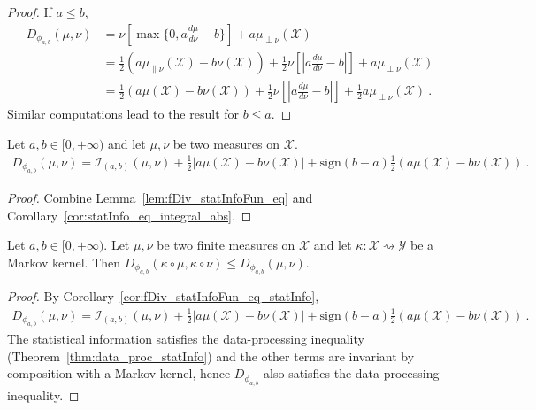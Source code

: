 \begin{proof}\leanok
\uses{}
If $a \le b$,
\begin{align*}
D_{\phi_{a,b}}(\mu, \nu)
&= \nu\left[ \max\{0, a \frac{d\mu}{d\nu} - b\} \right] + a \mu_{\perp \nu}(\mathcal X)
\\
&= \frac{1}{2}(a \mu_{\parallel \nu}(\mathcal X) - b \nu(\mathcal X)) + \frac{1}{2}\nu\left[ \left\vert a \frac{d\mu}{d\nu} - b \right\vert \right] + a \mu_{\perp \nu}(\mathcal X)
\\
&= \frac{1}{2}(a \mu(\mathcal X) - b \nu(\mathcal X)) + \frac{1}{2}\nu\left[ \left\vert a \frac{d\mu}{d\nu} - b \right\vert \right] + \frac{1}{2}a \mu_{\perp \nu}(\mathcal X)
\: . 
\end{align*}
Similar computations lead to the result for $b \le a$.
\end{proof}

\begin{corollary}
  \label{cor:fDiv_statInfoFun_eq_statInfo}
  \leanok
  Let $a,b \in [0, +\infty)$ and let $\mu, \nu$ be two measures on $\mathcal X$.
  \begin{align*}
  D_{\phi_{a,b}}(\mu, \nu) = \mathcal I_{(a,b)}(\mu, \nu) + \frac{1}{2} \left\vert a \mu(\mathcal X) - b \nu(\mathcal X) \right\vert + \text{sign}(b-a)\frac{1}{2}(a \mu(\mathcal X) - b \nu(\mathcal X))
  \: .
  \end{align*}
\end{corollary}

\begin{proof}\leanok
{}
Combine Lemma~\ref{lem:fDiv_statInfoFun_eq} and Corollary~\ref{cor:statInfo_eq_integral_abs}.
\end{proof}

\begin{lemma}
  \label{lem:fDiv_phi_data_proc}
  \leanok
  Let $a,b \in [0, +\infty)$. Let $\mu, \nu$ be two finite measures on $\mathcal X$ and let $\kappa : \mathcal X \rightsquigarrow \mathcal Y$ be a Markov kernel.
  Then $D_{\phi_{a,b}}(\kappa \circ \mu, \kappa \circ \nu) \le D_{\phi_{a,b}}(\mu, \nu)$.
\end{lemma}

\begin{proof}\leanok
{}
By Corollary~\ref{cor:fDiv_statInfoFun_eq_statInfo},
\begin{align*}
D_{\phi_{a,b}}(\mu, \nu) = \mathcal I_{(a,b)}(\mu, \nu) + \frac{1}{2} \left\vert a \mu(\mathcal X) - b \nu(\mathcal X) \right\vert + \text{sign}(b-a)\frac{1}{2}(a \mu(\mathcal X) - b \nu(\mathcal X))
\: .
\end{align*}
The statistical information satisfies the data-processing inequality (Theorem~\ref{thm:data_proc_statInfo}) and the other terms are invariant by composition with a Markov kernel, hence $D_{\phi_{a,b}}$ also satisfies the data-processing inequality.
\end{proof}

